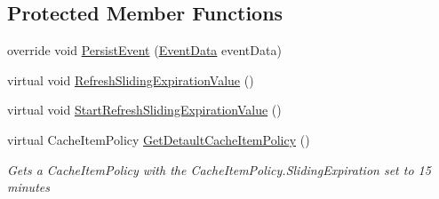 \subsection*{Protected Member Functions}
\begin{DoxyCompactItemize}
\item 
override void \hyperlink{classCqrs_1_1Events_1_1MemoryCacheEventStore_a9b1a1aaab34770bd68ebcedca0fc40b0_a9b1a1aaab34770bd68ebcedca0fc40b0}{Persist\+Event} (\hyperlink{classCqrs_1_1Events_1_1EventData}{Event\+Data} event\+Data)
\item 
virtual void \hyperlink{classCqrs_1_1Events_1_1MemoryCacheEventStore_a4cac39acb87d9e25c4c090a384515d11_a4cac39acb87d9e25c4c090a384515d11}{Refresh\+Sliding\+Expiration\+Value} ()
\item 
virtual void \hyperlink{classCqrs_1_1Events_1_1MemoryCacheEventStore_ac2a6da8b2faac7bd5f333bff592fc8f2_ac2a6da8b2faac7bd5f333bff592fc8f2}{Start\+Refresh\+Sliding\+Expiration\+Value} ()
\item 
virtual Cache\+Item\+Policy \hyperlink{classCqrs_1_1Events_1_1MemoryCacheEventStore_a2dddf1e1c4c737ad393655ee990953b3_a2dddf1e1c4c737ad393655ee990953b3}{Get\+Detault\+Cache\+Item\+Policy} ()
\begin{DoxyCompactList}\small\item\em Get\textquotesingle{}s a Cache\+Item\+Policy with the Cache\+Item\+Policy.\+Sliding\+Expiration set to 15 minutes \end{DoxyCompactList}\end{DoxyCompactItemize}
